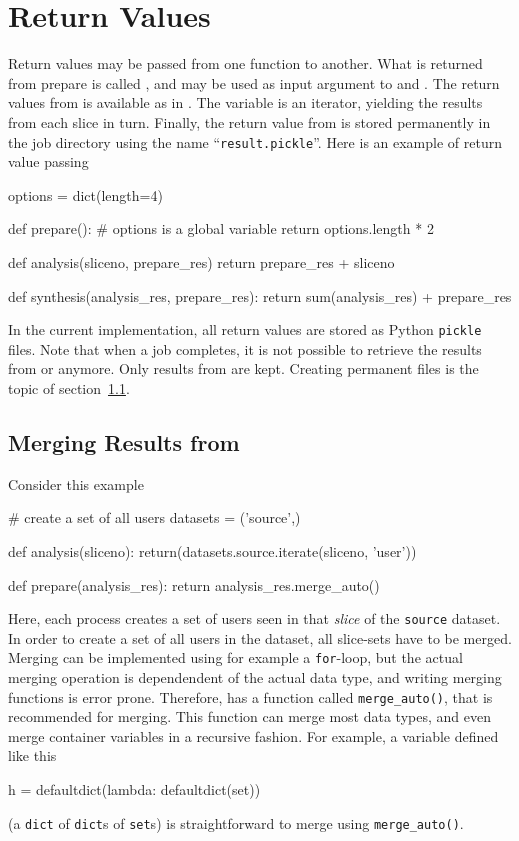 \section{Return Values}
Return values may be passed from one function to another.  What is
returned from prepare is called \prepareres, and may be used as input
argument to \analysis and \synthesis.  The return values from
\analysis is available as \analysisres in \synthesis.  The
\analysisres variable is an iterator, yielding the results from each
slice in turn.  Finally, the return value from \synthesis is stored
permanently in the job directory using the name
``\texttt{result.pickle}''.  Here is an example of return value passing
\begin{python}
options = dict(length=4)

def prepare():
    # options is a global variable
    return options.length * 2

def analysis(sliceno, prepare_res)
    return prepare_res + sliceno

def synthesis(analysis_res, prepare_res):
     return sum(analysis_res) + prepare_res
\end{python}
In the current implementation, all return values are stored as Python
\texttt{pickle} files.  Note that when a job completes, it is not
possible to retrieve the results from \prepare or \analysis anymore.
Only results from \synthesis are kept.  Creating permanent files is
the topic of section~\ref{}.


\subsection{Merging Results from \analysis}
Consider this example
\begin{python}
# create a set of all users
datasets = ('source',)
  
def analysis(sliceno):
    return(datasets.source.iterate(sliceno, 'user'))

def prepare(analysis_res):
    return analysis_res.merge_auto()
\end{python}
Here, each \analysis process creates a set of users seen in that
\textsl{slice} of the \texttt{source} dataset.  In order to create a
set of all users in the dataset, all slice-sets have to be merged.
Merging can be implemented using for example a \texttt{for}-loop, but
the actual merging operation is dependendent of the actual data type,
and writing merging functions is error prone.  Therefore, \analysisres
has a function called \texttt{merge\_auto()}, that is recommended for
merging.  This function can merge most data types, and even merge
container variables in a recursive fashion.  For example, a variable
defined like this 
\begin{python}
h = defaultdict(lambda: defaultdict(set))
\end{python}
(a \texttt{dict} of \texttt{dict}s of \texttt{set}s) is
straightforward to merge using \texttt{merge\_auto()}.



